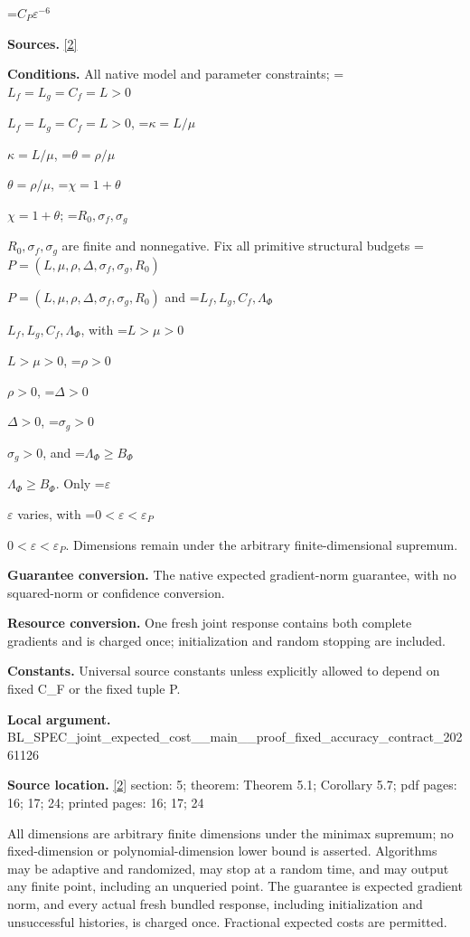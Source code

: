 \documentclass[10pt,a4paper]{article}
\newcommand{\AtlasMath}[1]{\par\begingroup\centering\setbox0=\hbox{$\displaystyle #1$}\ifdim\wd0>1.4\linewidth\typeout{ATLAS WIDE FORMULA: \the\wd0}\fi\ifdim\wd0>\linewidth\resizebox{\linewidth}{!}{\box0}\else\box0\fi\par\endgroup}
\newcommand{\AtlasInlineMath}[1]{\begingroup\setbox0=\hbox{$#1$}\ifdim\wd0>.4\linewidth\endgroup\AtlasMath{#1}\else\endgroup$#1$\fi}
\begin{document}
\AtlasMath{C_P\varepsilon^{-6}}


\textbf{Sources.} \href{https://github.com/WU-Wendao/Colombo/blob/main/colombo_sensorium/Complexity_altas/data/sources/colombo/SFO_JOINT_20261126/manuscript.pdf}{[2]}



\textbf{Conditions.} All native model and parameter constraints; \AtlasInlineMath{L_f=L_g=C_f=L>0}, \AtlasInlineMath{\kappa=L/\mu}, \AtlasInlineMath{\theta=\rho/\mu}, \AtlasInlineMath{\chi=1+\theta}; \AtlasInlineMath{R_0,\sigma_f,\sigma_g} are finite and nonnegative. Fix all primitive structural budgets \AtlasInlineMath{P=(L,\mu,\rho,\Delta,\sigma_f,\sigma_g,R_0)} and \AtlasInlineMath{L_f,L_g,C_f,\Lambda_\Phi}, with \AtlasInlineMath{L>\mu>0}, \AtlasInlineMath{\rho>0}, \AtlasInlineMath{\Delta>0}, \AtlasInlineMath{\sigma_g>0}, and \AtlasInlineMath{\Lambda_\Phi\ge B_\Phi}. Only \AtlasInlineMath{\varepsilon} varies, with \AtlasInlineMath{0<\varepsilon<\varepsilon_P}. Dimensions remain under the arbitrary finite-dimensional supremum.



\textbf{Guarantee conversion.} The native expected gradient-norm guarantee, with no squared-norm or confidence conversion.



\textbf{Resource conversion.} One fresh joint response contains both complete gradients and is charged once; initialization and random stopping are included.



\textbf{Constants.} Universal source constants unless explicitly allowed to depend on fixed C\_F or the fixed tuple P.



\textbf{Local argument.} BL\_SPEC\_joint\_expected\_c\allowbreak{}ost\_\_main\_\_proof\_fixed\_a\allowbreak{}ccuracy\_contract\_2026112\allowbreak{}6



\textbf{Source location.} \href{https://github.com/WU-Wendao/Colombo/blob/main/colombo_sensorium/Complexity_altas/data/sources/colombo/SFO_JOINT_20261126/manuscript.pdf}{[2]} section: 5; theorem: Theorem 5.1; Corollary 5.7; pdf pages: 16; 17; 24; printed pages: 16; 17; 24



All dimensions are arbitrary finite dimensions under the minimax supremum; no fixed-dimension or polynomial-dimension lower bound is asserted. Algorithms may be adaptive and randomized, may stop at a random time, and may output any finite point, including an unqueried point. The guarantee is expected gradient norm, and every actual fresh bundled response, including initialization and unsuccessful histories, is charged once. Fractional expected costs are permitted.
\end{document}
